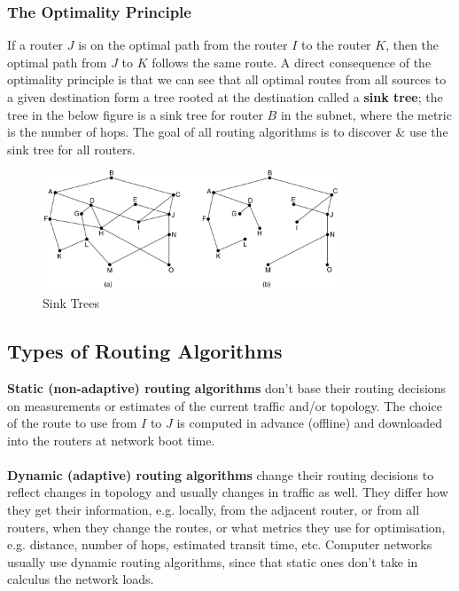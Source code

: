 \documentclass[a4paper,11pt]{article}
\begin{document}
\subsubsection{The Optimality Principle}
If a router $J$ is on the optimal path from the router $I$ to the router $K$, then the optimal path from $J$ to 
$K$ follows the same route. 
A direct consequence of the optimality principle is that we can see that all optimal routes from all sources to 
a given destination form a tree rooted at the destination called a \textbf{sink tree};
the tree in the below figure is a sink tree for router $B$ in the subnet, where the metric is the number of hops. 
The goal of all routing algorithms is to discover \& use the sink tree for all routers.
\begin{figure}[H]
    \centering
    \includegraphics[width=0.8\textwidth]{./images/optimality_principle.png}
    \caption{Sink Trees}
\end{figure}

\subsection{Types of Routing Algorithms}
\textbf{Static (non-adaptive) routing algorithms} don't base their routing decisions on measurements or estimates
of the current traffic and/or topology.
The choice of the route to use from $I$ to $J$ is computed in advance (offline) and downloaded into the routers
at network boot time.
\\\\
\textbf{Dynamic (adaptive) routing algorithms} change their routing decisions to reflect changes in topology and
usually changes in traffic as well.
They differ how they get their information, e.g. locally, from the adjacent router, or from all routers, when 
they change the routes, or what metrics they use for optimisation, e.g. distance, number of hops, estimated 
transit time, etc.
Computer networks usually use dynamic routing algorithms, since that static ones don't take in calculus the 
network loads.
\end{document}
